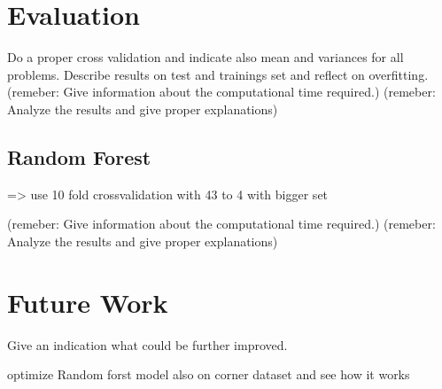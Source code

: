 \documentclass[conference]{IEEEtran}
\begin{document}


\section{Evaluation}
Do a proper cross validation and indicate also mean and variances for all problems. Describe results on test and trainings set and reflect on overfitting. 
(remeber: Give information about the computational time required.)
(remeber: Analyze the results and give proper explanations)




\subsection{Random Forest}
=> use 10 fold crossvalidation with 43 to 4 with bigger set

(remeber: Give information about the computational time required.)
(remeber: Analyze the results and give proper explanations)

\section{Future Work}
Give an indication what could be further improved. 

optimize Random forst model also on corner dataset and see how it works


\end{document}
